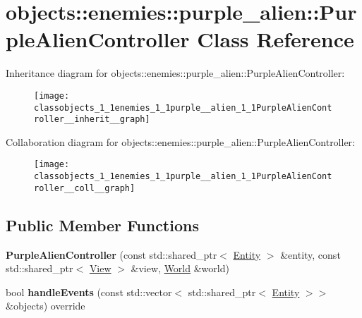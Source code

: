 \hypertarget{classobjects_1_1enemies_1_1purple__alien_1_1PurpleAlienController}{}\section{objects\+:\+:enemies\+:\+:purple\+\_\+alien\+:\+:Purple\+Alien\+Controller Class Reference}
\label{classobjects_1_1enemies_1_1purple__alien_1_1PurpleAlienController}


Inheritance diagram for objects\+:\+:enemies\+:\+:purple\+\_\+alien\+:\+:Purple\+Alien\+Controller\+:\nopagebreak
\begin{figure}[H]
\begin{center}
\leavevmode
\texttt{[image: classobjects\_1\_1enemies\_1\_1purple\_\_alien\_1\_1PurpleAlienController\_\_inherit\_\_graph]}
\end{center}
\end{figure}


Collaboration diagram for objects\+:\+:enemies\+:\+:purple\+\_\+alien\+:\+:Purple\+Alien\+Controller\+:\nopagebreak
\begin{figure}[H]
\begin{center}
\leavevmode
\texttt{[image: classobjects\_1\_1enemies\_1\_1purple\_\_alien\_1\_1PurpleAlienController\_\_coll\_\_graph]}
\end{center}
\end{figure}
\subsection*{Public Member Functions}
\begin{DoxyCompactItemize}
\item 
\mbox{\label{classobjects_1_1enemies_1_1purple__alien_1_1PurpleAlienController_a4b88d417d2e14f4bc551be7b54aa31e1}}
{\bfseries Purple\+Alien\+Controller} (const std\+::shared\+\_\+ptr$<$ \hyperlink{classobjects_1_1Entity}{Entity} $>$ \&entity, const std\+::shared\+\_\+ptr$<$ \hyperlink{classobjects_1_1View}{View} $>$ \&view, \hyperlink{classWorld}{World} \&world)
\item 
\mbox{\label{classobjects_1_1enemies_1_1purple__alien_1_1PurpleAlienController_a799cfca29a4cd55b64a7fa4fc5753d59}}
bool {\bfseries handle\+Events} (const std\+::vector$<$ std\+::shared\+\_\+ptr$<$ \hyperlink{classobjects_1_1Entity}{Entity} $>$$>$ \&objects) override
\end{DoxyCompactItemize}
